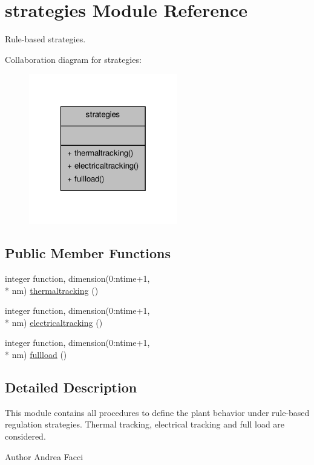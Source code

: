 \hypertarget{classstrategies}{\section{strategies Module Reference}
\label{classstrategies}
}


Rule-\/based strategies.  




Collaboration diagram for strategies\-:
\nopagebreak
\begin{figure}[H]
\begin{center}
\leavevmode
\includegraphics[width=184pt]{classstrategies__coll__graph}
\end{center}
\end{figure}
\subsection*{Public Member Functions}
\begin{DoxyCompactItemize}
\item 
integer function, dimension(0\-:ntime+1, \\*
nm) \hyperlink{classstrategies_a8a41b83f755ed54fbcd9128380451589}{thermaltracking} ()
\item 
integer function, dimension(0\-:ntime+1, \\*
nm) \hyperlink{classstrategies_aac91d9eee08b1644099d67f410f82d58}{electricaltracking} ()
\item 
integer function, dimension(0\-:ntime+1, \\*
nm) \hyperlink{classstrategies_a3abfa1fd92febbe0e3b58fdc4d646165}{fullload} ()
\end{DoxyCompactItemize}


\subsection{Detailed Description}
This module contains all procedures to define the plant behavior under rule-\/based regulation strategies. Thermal tracking, electrical tracking and full load are considered. \begin{DoxyAuthor}{Author}
Andrea Facci 
\end{DoxyAuthor}


